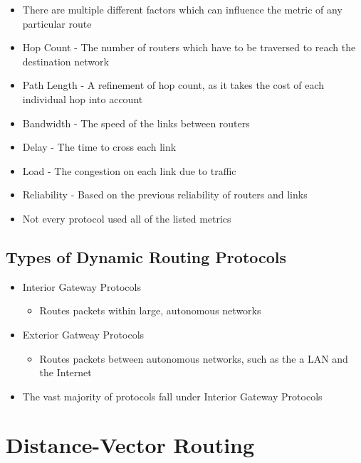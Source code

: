 \begin{itemize}
  \item There are multiple different factors which can influence the metric of any particular route
  \item Hop Count - The number of routers which have to be traversed to reach the destination network
  \item Path Length - A refinement of hop count, as it takes the cost of each individual hop into account
  \item Bandwidth - The speed of the links between routers
  \item Delay - The time to cross each link
  \item Load - The congestion on each link due to traffic
  \item Reliability - Based on the previous reliability of routers and links
  \item Not every protocol used all of the listed metrics
\end{itemize}

\subsection*{Types of Dynamic Routing Protocols}

\begin{itemize}
  \item Interior Gateway Protocols
  \begin{itemize}
    \item Routes packets within large, autonomous networks
  \end{itemize}
  \item Exterior Gatweay Protocols
  \begin{itemize}
    \item Routes packets between autonomous networks, such as the a LAN and the Internet
  \end{itemize}
  \item The vast majority of protocols fall under Interior Gateway Protocols
\end{itemize}

\section*{Distance-Vector Routing}

